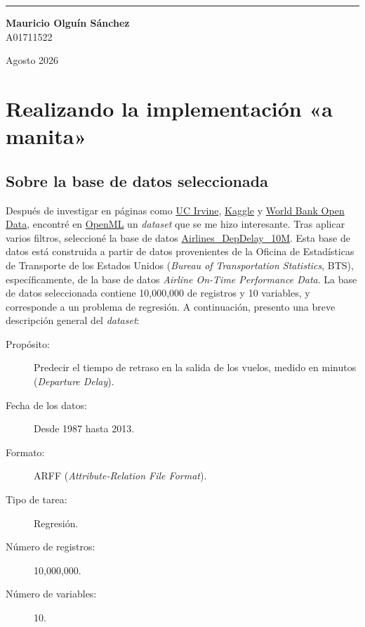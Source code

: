 \documentclass[a4paper,12pt,twocolumn]{report}
\begin{document}
\begin{titlepage}
\begin{center}
        \vspace{1.2cm}

        \rule{0.55\textwidth}{1pt}

        \vspace{0.8cm}

        {\large
        \textbf{Mauricio Olguín Sánchez}\\
        A01711522}

    \end{center}

    \vfill

    \begin{center}
        {\large
        Agosto 2026}
    \end{center}

\end{titlepage}

\tableofcontents
\clearpage
{}

\chapter{Realizando la implementación «a manita»}

\section{Sobre la base de datos seleccionada}

Después de investigar en páginas como \href{https://archive.ics.uci.edu/}{UC Irvine}, \href{https://kaggle.com/}{Kaggle} y \href{https://data.worldbank.org/}{World Bank Open Data}, encontré en \href{https://www.openml.org/}{OpenML} un \textit{dataset} que se me hizo interesante. Tras aplicar varios filtros, seleccioné la base de datos \href{https://www.openml.org/search?type=data&status=active&id=42728}{Airlines\_DepDelay\_10M}.
\newline
Esta base de datos está construida a partir de datos provenientes de la Oficina de Estadísticas de Transporte de los Estados Unidos (\textit{Bureau of Transportation Statistics}, BTS), específicamente, de la base de datos \textit{Airline On-Time Performance Data}.
\newline
La base de datos seleccionada contiene 10,000,000 de registros y 10 variables, y corresponde a un problema de regresión. A continuación, presento una breve descripción general del \textit{dataset}:
\begin{description}
	\item[Propósito:] Predecir el tiempo de retraso en la salida de los vuelos, medido en minutos (\textit{Departure Delay}).
	\item[Fecha de los datos:] Desde 1987 hasta 2013.
	\item[Formato:] ARFF (\textit{Attribute-Relation File Format}).
	\item[Tipo de tarea:] Regresión.
	\item[Número de registros:] 10,000,000.
    \item[Número de variables:] 10.
\end{description}
\end{document}
